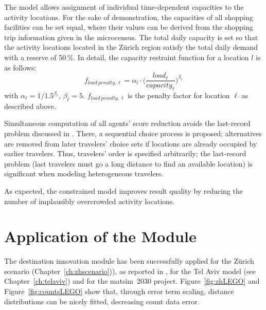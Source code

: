 The model allows assignment of individual time-dependent capacities to the activity locations. For the sake of demonstration, the capacities of all shopping facilities can be set equal, where their values can be derived from the shopping trip information given in the \gls{microcensus}.
The total daily capacity is set so that the activity locations located in the Zürich  region satisfy the total daily demand with a reserve of 50\,\%. In detail, the capacity restraint function for a location $l$ is as follows:
\[
f_{load\ penalty, \ell}=\alpha_l \cdot \Bigg(\frac{load_{\ell}}{capacity_{\ell}}\Bigg)^{\beta_\ell}
\]
with $\alpha_\ell=1/1.5^{\beta_\ell}$, $\beta_\ell=5$. $f_{load\ penalty, \ell}$ is the penalty factor for location $\ell$ as described above.

Simultaneous computation of all agents' score reduction avoids the last-record problem discussed in \citet[][]{VovshaEtAl_TRR_2002}. 
There, a sequential choice process is proposed; alternatives are removed from later travelers' choice sets if locations are already occupied by earlier travelers. 
Thus, travelers' order is specified arbitrarily; the last-record problem (last travelers must go a long distance to find an available location) is significant when modeling heterogeneous travelers. 

As expected, the constrained model improves result quality by reducing the number of implausibly overcrowded activity locations.

\section{Application of the Module}
The destination innovation module has been successfully applied for the Zürich scenario (Chapter~\ref{ch:zhscenario})), as reported in \citet[][p.99]{Horni_PhDThesis_2013}, for the Tel Aviv model (see Chapter~\ref{ch:telaviv}) and for the \gls{matsim}~2030 project. 
Figure~\ref{fig:zhLEGO} and Figure~\ref{fig:countsLEGO} show that, through error term scaling, distance distributions can be nicely fitted, decreasing count data error.

